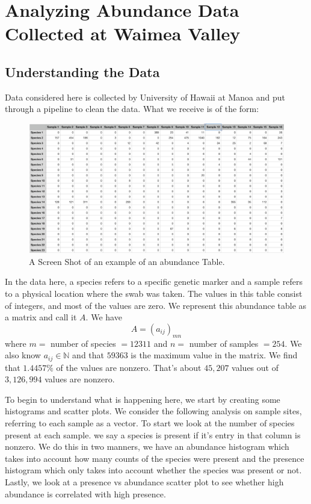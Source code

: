 \documentclass{article}
\newcommand{\N}{\mathbb{N}}
\theoremstyle{definition} \newtheorem*{lte}{Definition}
\theoremstyle{plain} \newtheorem*{csbt}{Theorem}
\begin{document}
\section*{Analyzing Abundance Data Collected at Waimea Valley }
 
\subsection*{Understanding the Data}
Data considered here is collected by University of Hawaii at Manoa and put through a pipeline to clean the data. What we receive is of the form: \\

\begin{figure}[H]
\begin{center}
  \includegraphics[width=\linewidth]{abundance.png}
  \caption{A Screen Shot of an example of an abundance Table.}
  \label{fig:AbundanceTable}
  \end{center}
\end{figure}

In the data here, a species refers to a specific genetic marker and a sample refers to a physical location where the swab was taken. The values in this table consist of integers, and most of the values are zero. We represent this abundance table as a matrix and call it $A$. We have 
$$A = (a_{ij})_{mn}$$ 
where $m = $ number of species $ = 12311$ and $n = $ number of samples $ = 254$. We also know $a_{ij} \in \N$ and that $59363$ is the maximum value in the matrix. We find that $1.4457\%$ of the values are nonzero. That's about $45,207$ values out of $3,126,994$ values are nonzero. 

To begin to understand what is happening here, we start by creating some histograms and scatter plots. We consider the following analysis on sample sites, referring to each sample as a vector. To start we look at the number of species present at each sample. we say a species is present if it's entry in that column is nonzero. We do this in two manners, we have an abundance histogram which takes into account how many counts of the species were present and the presence histogram which only takes into account whether the species was present or not. Lastly, we look at a presence vs abundance scatter plot to see whether high abundance is correlated with high presence. 
\end{document}
